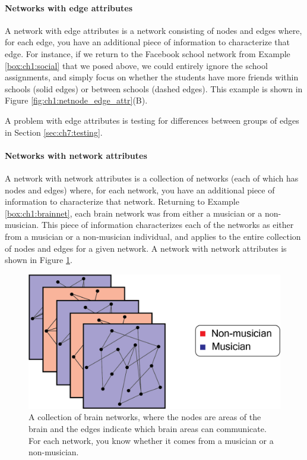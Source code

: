 \paragraph{Networks with edge attributes}

A network with edge attributes is a network consisting of nodes and edges where, for each edge, you have an additional piece of information to characterize that edge. For instance, if we return to the Facebook school network from Example \ref{box:ch1:social} that we posed above, we could entirely ignore the school assignments, and simply focus on whether the students have more friends within schools (solid edges) or between schools (dashed edges). This example is shown in Figure \ref{fig:ch1:netnode_edge_attr}(B).


A problem with edge attributes is testing for differences between groups of edges in Section \ref{sec:ch7:testing}.


\paragraph{Networks with network attributes}

A network with network attributes is a collection of networks (each of which has nodes and edges) where, for each network, you have an additional piece of information to characterize that network. Returning to Example \ref{box:ch1:brainnet}, each brain network was from either a musician or a non-musician. This piece of information characterizes each of the networks as either from a musician or a non-musician individual, and applies to the {entire} collection of nodes and edges for a given network. A network with network attributes is shown in Figure \ref{fig:ch1:netnetattr}.

\begin{figure}[h]
\centering
\includegraphics[width=0.8\linewidth]{foundations/ch1/Images/netattr_ex.png}
\caption[Brain networks]{A collection of brain networks, where the nodes are areas of the brain and the edges indicate which brain areas can communicate. For each network, you know whether it comes from a musician or a non-musician.}
\label{fig:ch1:netnetattr}
\end{figure}


